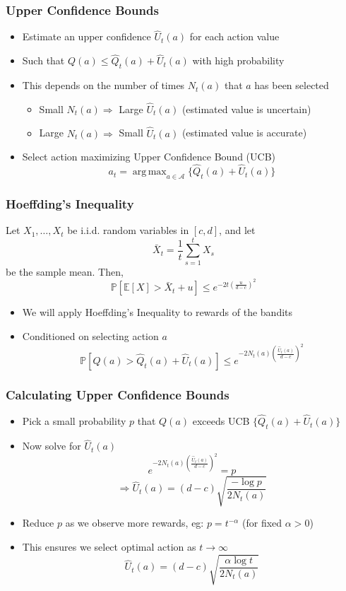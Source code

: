 \documentclass[handout]{beamer}
\DeclareMathOperator*{\argmax}{arg\,max}
\begin{document}
\begin{frame}
\frametitle{Upper Confidence Bounds}
\pause
\begin{itemize}[<+->]
\item Estimate an upper confidence $\hat{U}_t(a)$ for each action value
\item Such that $Q(a) \leq \hat{Q}_t(a) + \hat{U}_t(a)$ with high probability
\item This depends on the number of times $N_t(a)$ that $a$ has been selected
\begin{itemize}
\item Small $N_t(a) \Rightarrow$ Large $\hat{U}_t(a)$ (estimated value is uncertain)
\item Large $N_t(a) \Rightarrow$ Small $\hat{U}_t(a)$ (estimated value is accurate)
\end{itemize}
\item Select action maximizing Upper Confidence  Bound (UCB)
$$a_t = \argmax_{a\in\mathcal{A}} \{ \hat{Q}_t(a) + \hat{U}_t(a) \}$$
\end{itemize}
\end{frame}

\begin{frame}
\frametitle{Hoeffding's Inequality}
\pause
\begin{theorem}
Let $X_1, \ldots, X_t$ be i.i.d. random variables in $[c,d]$, and let $$\bar{X}_t = \frac 1 t \sum_{s=1}^t X_s$$ be the sample mean. Then,
$$\mathbb{P}[\mathbb{E}[X] > \bar{X}_t + u] \leq e^{-2t(\frac u {d-c})^2}$$
\end{theorem}
\begin{itemize}[<+->]
\item We will apply Hoeffding's Inequality to rewards of the bandits
\item Conditioned on selecting action $a$
$$\mathbb{P}[Q(a) > \hat{Q}_t(a) + \hat{U}_t(a)] \leq e^{-2N_t(a)(\frac {\hat{U}_t(a)} {d-c})^2}$$
\end{itemize}
\end{frame}



\begin{frame}
\frametitle{Calculating Upper Confidence Bounds}
\pause
\begin{itemize}[<+->]
\item Pick a small probability $p$ that $Q(a)$ exceeds UCB $\{\hat{Q}_t(a) + \hat{U}_t(a)\}$
\item Now solve for $\hat{U}_t(a)$
$$e^{-2N_t(a)(\frac {\hat{U}_t(a)} {d-c})^2} = p$$
$$\Rightarrow \hat{U}_t(a) = (d-c)\sqrt{\frac {-\log p} {2 N_t(a)}}$$
\item Reduce $p$ as we observe more rewards, eg: $p = t^{-\alpha}$ (for fixed $\alpha > 0$)
\item This ensures we select optimal action as $t\rightarrow \infty$
$$\hat{U}_t(a) = (d-c)\sqrt{\frac {\alpha \log t} {2N_t(a)}}$$
\end{itemize}
\end{frame}
\end{document}
